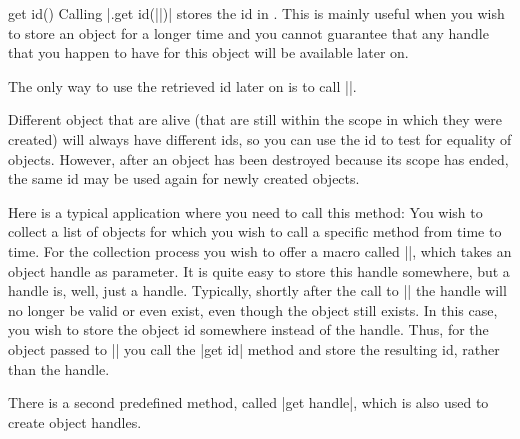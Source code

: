 \begin{predefinedmethod}{get id()}
    Calling |.get id(||)|  stores the id  in
    . This is mainly useful when you wish to store an object for a
    longer time and you cannot guarantee that any handle that you happen to
    have for this object will be available later on.

    The only way to use the retrieved id later on is to call |\pgfooobj|.

    Different object that are alive (that are still within the scope in which
    they were created) will always have different ids, so you can use the id to
    test for equality of objects. However, after an object has been destroyed
    because its scope has ended, the same id may be used again for newly
    created objects.

    Here is a typical application where you need to call this method: You wish
    to collect a list of objects for which you wish to call a specific method
    from time to time. For the collection process you wish to offer a macro
    called |\addtoobjectlist|, which takes an object handle as parameter. It is
    quite easy to store this handle somewhere, but a handle is, well, just a
    handle. Typically, shortly after the call to |\addtoobjectlist| the handle
    will no longer be valid or even exist, even though the object still exists.
    In this case, you wish to store the object id somewhere instead of the
    handle. Thus, for the object passed to |\addtoobjectlist| you call the
    |get id| method and store the resulting id, rather than the handle.
\end{predefinedmethod}

There is a second predefined method, called |get handle|, which is also used to
create object handles.



